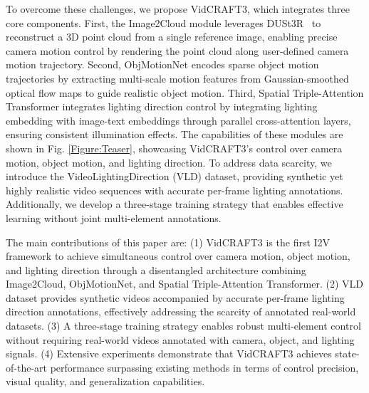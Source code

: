 To overcome these challenges, we propose VidCRAFT3, which integrates three core components. First, the Image2Cloud module leverages DUSt3R~\cite{wang2024dust3r} to reconstruct a 3D point cloud from a single reference image, enabling precise camera motion control by rendering the point cloud along user-defined camera motion trajectory. Second, ObjMotionNet encodes sparse object motion trajectories by extracting multi-scale motion features from Gaussian-smoothed optical flow maps to guide realistic object motion. Third, Spatial Triple-Attention Transformer integrates lighting direction control by integrating lighting embedding with image-text embeddings through parallel cross-attention layers, ensuring consistent illumination effects. 
The capabilities of these modules are shown in Fig. \ref{Figure:Teaser}, showcasing VidCRAFT3's control over camera motion, object motion, and lighting direction.
To address data scarcity, we introduce the VideoLightingDirection (VLD) dataset, providing synthetic yet highly realistic video sequences with accurate per-frame lighting annotations. Additionally, we develop a three-stage training strategy that enables effective learning without joint multi-element annotations.

The main contributions of this paper are:
(1) VidCRAFT3 is the first I2V framework to achieve simultaneous control over camera motion, object motion, and lighting direction through a disentangled architecture combining Image2Cloud, ObjMotionNet, and Spatial Triple-Attention Transformer.
(2) VLD dataset provides synthetic videos accompanied by accurate per-frame lighting direction annotations, effectively addressing the scarcity of annotated real-world datasets.
(3) A three-stage training strategy enables robust multi-element control without requiring real-world videos annotated with camera, object, and lighting signals.
(4) Extensive experiments demonstrate that VidCRAFT3 achieves state-of-the-art performance surpassing existing methods in terms of control precision, visual quality, and generalization capabilities.

